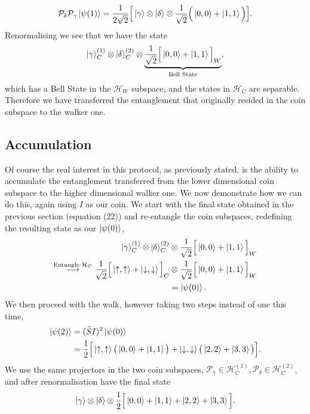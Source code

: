\begin{equation}
    \mathcal{P}_\delta \mathcal{P}_\gamma \ket{\psi(1)} = \frac{1}{2\sqrt{2}}\Big [\ket{\gamma}\otimes \ket{\delta} \otimes \frac{1}{\sqrt{2}}\Big (\ket{0, 0} + \ket{1, 1}\Big )\Big ].
\end{equation}
Renormalising we see that we have the state
\begin{equation}
    \ket{\gamma}^{(1)}_C \otimes \ket{\delta}^{(2)}_C \otimes \underbrace{\frac{1}{\sqrt{2}}\Big [\ket{0, 0} + \ket{1, 1}\Big ]_W}_{\text{Bell State}},
\end{equation}
which has a Bell State in the $\mathcal{H}_W$ subspace, and the states in $\mathcal{H}_C$ are separable. Therefore we have transferred the entanglement that originally resided in the coin subspace to the walker one.

\subsection{Accumulation}
Of course the real interest in this protocol, as previously stated, is the ability to accumulate the entanglement transferred from the lower dimensional coin subspace to the higher dimensional walker one. We now demonstrate how we can do this, again using $I$ as our coin. We start with the final state obtained in the previous section (equation (22)) and re-entangle the coin subspaces, redefining the resulting state as our $\ket{\psi(0)}$,
\begin{align}
    \ket{\gamma}^{(1)}_C \otimes \ket{\delta}^{(2)}_C &\otimes \frac{1}{\sqrt{2}}\Big [\ket{0, 0} + \ket{1, 1}\Big ]_W\\
    \overset{\text{Entangle }\mathcal{H}_C}{\longrightarrow} \frac{1}{\sqrt{2}} \Big [\ket{\uparrow, \uparrow} + \ket{\downarrow, \downarrow}\Big ]_C &\otimes \frac{1}{\sqrt{2}}\Big [\ket{0, 0} + \ket{1, 1}\Big ]_W\\
    &=\ket{\psi(0)}.
\end{align}
We then proceed with the walk, however taking two steps instead of one this time,
\begin{align}
    \ket{\psi(2)} &= (\tilde{S}I)^2\ket{\psi(0)}\\
    &= \frac{1}{2}\Big[\ket{\uparrow,\uparrow}\big (\ket{0,0}+\ket{1,1}\big ) + \ket{\downarrow,\downarrow}\big (\ket{2,2} + \ket{3,3}\big )\Big ].
\end{align}
We use the same projectors in the two coin subspaces, $\mathcal{P}_\gamma \in \mathcal{H}^{(1)}_C,  \mathcal{P}_\delta \in \mathcal{H}^{(2)}_C$, and after renormalisation have the final state
\begin{equation}
    \ket{\gamma}\otimes\ket{\delta}\otimes\frac{1}{2}\Big[\ket{0,0} + \ket{1,1} + \ket{2,2} + \ket{3,3}\Big ].
\end{equation}

